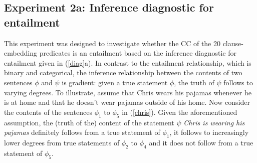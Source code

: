 \documentclass[11pt,fleqn]{article}
\newcommand{\6}{\mbox{$[\hspace*{-.6mm}[$}}
\newcommand{\9}{\mbox{$]\hspace*{-.6mm}]$}}
\begin{document}
%
%
%
%

\subsection{Experiment 2a: Inference diagnostic for entailment}\label{s31}

This experiment was designed to investigate whether the CC of the 20 clause-embedding predicates is an entailment based on the inference diagnostic for entailment given in (\ref{diag}a). In contrast to the entailment relationship, which is binary and categorical, the inference relationship between the contents of two sentences $\phi$ and $\psi$ is gradient: given a true statement $\phi$, the truth of $\psi$ follows to varying degrees. To illustrate, assume that Chris wears his pajamas whenever he is at home and that he doesn't wear pajamas outside of his home. Now consider the contents of the sentences $\phi_1$ to $\phi_5$ in (\ref{chris}). Given the aforementioned assumption, the (truth of the) content of the statement $\psi$ {\em Chris is wearing his pajamas} definitely follows from a true statement of $\phi_1$, it follows to increasingly lower degrees from true statements of $\phi_2$ to $\phi_4$ and it does not follow from a true statement of $\phi_5$. 
\end{document}
